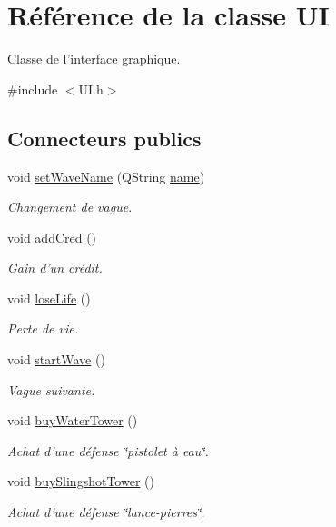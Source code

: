 \hypertarget{classUI}{
\section{Référence de la classe UI}
\label{classUI}
}


Classe de l'interface graphique.  




{\ttfamily \#include $<$UI.h$>$}

\subsection*{Connecteurs publics}
\begin{DoxyCompactItemize}
\item 
void \hyperlink{classUI_a59dd7970680cae33350521f15e986259}{setWaveName} (QString \hyperlink{classUI_a81ae571ef0c2c3044c1a5271887f5936}{name})
\begin{DoxyCompactList}\small\item\em Changement de vague. \end{DoxyCompactList}\item 
void \hyperlink{classUI_a00578d0269bf64abf71beb8b3e00a62b}{addCred} ()
\begin{DoxyCompactList}\small\item\em Gain d'un crédit. \end{DoxyCompactList}\item 
void \hyperlink{classUI_aea04048a2f3ab79ea3492c4f5e2e2c8d}{loseLife} ()
\begin{DoxyCompactList}\small\item\em Perte de vie. \end{DoxyCompactList}\item 
void \hyperlink{classUI_adca7adc8d262fe82ce9eb3950b334416}{startWave} ()
\begin{DoxyCompactList}\small\item\em Vague suivante. \end{DoxyCompactList}\item 
void \hyperlink{classUI_a2dbc930f722c8acdf2c59a01a2760576}{buyWaterTower} ()
\begin{DoxyCompactList}\small\item\em Achat d'une défense \char`\"{}pistolet à eau\char`\"{}. \end{DoxyCompactList}\item 
void \hyperlink{classUI_a64d35e18b3b5b896caa69830190c1751}{buySlingshotTower} ()
\begin{DoxyCompactList}\small\item\em Achat d'une défense \char`\"{}lance-\/pierres\char`\"{}. \end{DoxyCompactList}\item 

\end{DoxyCompactItemize}
